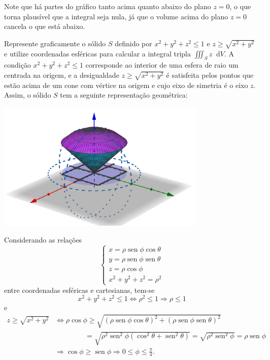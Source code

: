 \documentclass[12pt,a4paper]{article}
\newcommand*\diff{\mathop{}\!\mathrm{d}}
\newcommand*\sen{\operatorname{sen}}
\begin{document}
\begin{ExerciseList}
Note que há partes do gráfico tanto acima quanto abaixo do plano $z = 0$, o que torna plausível que a integral seja nula, já que o volume acima do plano $z = 0$ cancela o que está abaixo.


\Exercise[title={2,0}] Represente graficamente o sólido $S$ definido por $x^2 + y^2 + z^2 \leq 1$ e $z \geq \sqrt{x^2 + y^2}$ e utilize coordenadas esféricas para calcular a integral tripla $\iiint_{S} z \diff{V}$.
\Answer A condição $x^2 + y^2 + z^2 \leq 1$ corresponde ao interior de uma esfera de raio um centrada na origem, e a desigualdade $z \geq \sqrt{x^2 + y^2}$ é satisfeita pelos pontos que estão acima de um cone com vértice na origem e cujo eixo de simetria é o eixo $z$. Assim, o sólido $S$ tem a seguinte representação geométrica:

\begin{center}
  \includegraphics[width=10.0cm]{img/prova-3-nex-cone-esfera.png}
\end{center}

Considerando as relações
\[
\begin{cases}
  x = \rho \sen \phi \cos \theta\\
  y = \rho \sen \phi \sen \theta\\
  z = \rho \cos \phi\\
  x^2 + y^2 + z^2 = \rho^2
\end{cases}
\]
entre coordenadas esféricas e cartesianas, tem-se
\[
x^2 + y^2 + z^2 \leq 1
\Leftrightarrow
\rho^2 \leq 1
\Rightarrow
\rho \leq 1
\]
e
\begin{align*}
  z \geq \sqrt{x^2 + y^2}
  & \Leftrightarrow
    \rho \cos \phi
    \geq \sqrt{(\rho \sen \phi \cos \theta)^2 + (\rho \sen \phi \sen \theta)^2} \\
  & \qquad\quad\quad\ = \sqrt{\rho^2\sen^2\phi (\cos^2 \theta + \sen^2 \theta)}
    = \sqrt{\rho^2\sen^2\phi}
    = \rho\sen\phi\\
  & \Rightarrow
  \cos \phi \geq \sen\phi
  \Rightarrow
  0 \leq \phi \leq \frac{\pi}{4}.
\end{align*}


\end{ExerciseList}
\end{document}
